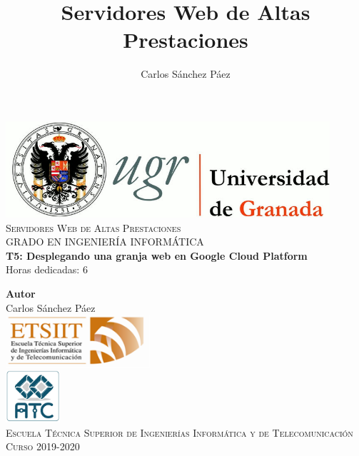 \documentclass[12pt,spanish]{article}
\title{Servidores Web de Altas Prestaciones}
\author{Carlos Sánchez Páez}
\begin{document}
\lstset{columns=fullflexible,basicstyle=\ttfamily}


\begin{titlepage}

 \newlength{\centeroffset}
 \setlength{\centeroffset}{-0.5\oddsidemargin}
 \addtolength{\centeroffset}{0.5\evensidemargin}
 \thispagestyle{empty}

 \noindent\hspace*{\centeroffset}
 \begin{minipage}{\textwidth}

  \centering
  \includegraphics[width=0.9\textwidth]{logo_ugr.jpg}\\[1.4cm]

  \textsc{ \Large Servidores Web de Altas Prestaciones\\[0.2cm]}
  \textsc{GRADO EN INGENIERÍA INFORMÁTICA}\\[1cm]

  {\Huge\bfseries T5: Desplegando una granja web en Google Cloud Platform \\}
	{\Large Horas dedicadas: 6 \\}

 \end{minipage}

 \vspace{1.5cm}
 \noindent\hspace*{\centeroffset}
 \begin{minipage}{\textwidth}
  \centering

  \textbf{Autor}\\ {Carlos Sánchez Páez}\\[2.5ex]
  \includegraphics[width=0.4\textwidth]{etsiit_logo.png}\\[0.1cm]
  \vspace{1.5cm}
  \includegraphics[width=0.15\textwidth]{atc.jpg}\\[0.1cm]
  \vspace{1cm}
  \textsc{Escuela Técnica Superior de Ingenierías Informática y de Telecomunicación}\\
  \vspace{1cm}
  \textsc{Curso 2019-2020}
 \end{minipage}
\end{titlepage}
\end{document}
